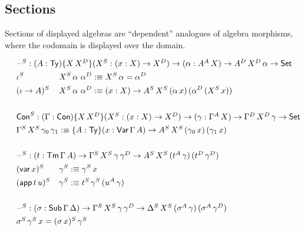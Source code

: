 \documentclass[12pt,a4paper,twoside,openany]{book}
\theoremstyle{remark}
\theoremstyle{definition}
\newcommand{\ms}[1]{\mathsf{#1}}
\newcommand{\Con}{\mathsf{Con}}
\newcommand{\Sub}{\mathsf{Sub}}
\newcommand{\Tm}{\mathsf{Tm}}
\newcommand{\Ty}{\mathsf{Ty}}
\newcommand{\blank}{\mathord{\hspace{1pt}\text{--}\hspace{1pt}}}
\newcommand{\Set}{\mathsf{Set}}
\newcommand{\Var}{\ms{Var}}
\newcommand{\var}{\ms{var}}
\newcommand{\app}{\ms{app}}
\newcommand{\defn}{:\equiv}
\begin{document}
\subsection{Sections}

Sections of displayed algebras are ``dependent'' analogues of algebra morphisms,
where the codomain is displayed over the domain.

\begin{alignat*}{3}
  & \hspace{-6em}\rlap{$\blank^S : (A : \Ty)\{X\,X^D\}(X^S : (x : X) \to X^D) \to (\alpha : A^A\,X) \to A^D\,X^D\,\alpha \to \Set$}\\
  & \hspace{-6em}\iota^S\,&&X^S\,\alpha\,\,\alpha^D \defn X^S\,\alpha = \alpha^D \\
  & \hspace{-6em}(\iota\to A)^S\,&&X^S\,\alpha\,\,\alpha^D \defn
  (x : X) \to A^S\,X^S\,(\alpha\,x)\,(\alpha^D\,(X^S\,x))\\
  & \hspace{-6em}&&\\
  &\hspace{-6em}\rlap{$\Con^S : (\Gamma : \Con)\{X\,X^D\}(X^S : (x : X) \to X^D) \to (\gamma : \Gamma^A\,X) \to \Gamma^D\,X^D\,\gamma \to \Set$}\\
  &\hspace{-6em}\rlap{$\Gamma^S\,X^S\,\gamma_0\,\gamma_1 \defn
    \{A : \Ty\}(x : \Var\,\Gamma\,A) \to A^S\,X^S\,(\gamma_0\,x)\,(\gamma_1\,x)$}\\
  & \hspace{-6em} && \\
  & \hspace{-6em}\rlap{$\blank^S : (t : \Tm\,\Gamma\,A) \to \Gamma^S\,X^S\,\gamma\,\gamma^D \to A^S\,X^S\,(t^A\,\gamma)\,(t^D\,\gamma^D)$}\\
  & \hspace{-6em}(\var\,x)^S    &&\gamma^S \defn \gamma^S\,x \\
  & \hspace{-6em}(\app\,t\,u)^S &&\gamma^S \defn t^S\,\gamma^S\,(u^A\,\gamma)\\
  & \hspace{-6em}&& \\
  & \hspace{-6em}\rlap{$\blank^S : (\sigma : \Sub\,\Gamma\,\Delta) \to \Gamma^S\,X^S\,\gamma\,\gamma^D \to \Delta^S\,X^S\,(\sigma^A\,\gamma)\,(\sigma^A\,\gamma^D)$}\\
  & \hspace{-6em} \rlap{$\sigma^S\, \gamma^S\,x = (\sigma\,x)^S\,\gamma^S$}
\end{alignat*}
\end{document}
